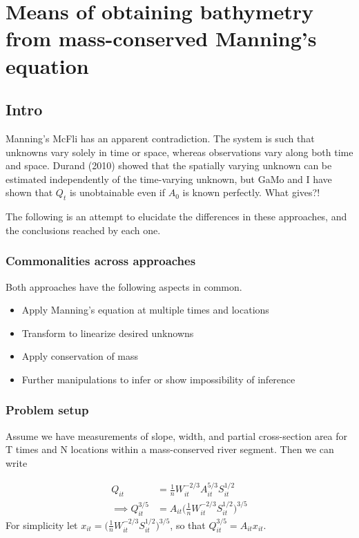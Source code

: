 \documentclass[]{article}
\title{}
\author{}
\date{}
\providecommand{\tightlist}{%
  \setlength{\itemsep}{0pt}\setlength{\parskip}{0pt}}
\begin{document}
\section{Means of obtaining bathymetry from mass-conserved Manning's
equation}\label{means-of-obtaining-bathymetry-from-mass-conserved-mannings-equation}

\subsection{Intro}\label{intro}

Manning's McFli has an apparent contradiction. The system is such that
unknowns vary solely in time or space, whereas observations vary along
both time and space. Durand (2010) showed that the spatially varying
unknown can be estimated independently of the time-varying unknown, but
GaMo and I have shown that \(Q_t\) is unobtainable even if \(A_0\) is
known perfectly. What gives?!

The following is an attempt to elucidate the differences in these
approaches, and the conclusions reached by each one.

\subsubsection{Commonalities across
approaches}\label{commonalities-across-approaches}

Both approaches have the following aspects in common.

\begin{itemize}
\tightlist
\item
  Apply Manning's equation at multiple times and locations
\item
  Transform to linearize desired unknowns
\item
  Apply conservation of mass
\item
  Further manipulations to infer or show impossibility of inference
\end{itemize}

\subsubsection{Problem setup}\label{problem-setup}

Assume we have measurements of slope, width, and partial cross-section
area for T times and N locations within a mass-conserved river segment.
Then we can write

\[
\begin{aligned}
Q_{it} &= \frac{1}{n} W_{it}^{-2/3} A_{it}^{5/3}S_{it}^{1/2} \\
\implies Q^{3/5}_{it} & = A_{it}\Big(\frac{1}{n} W_{it}^{-2/3} S_{it}^{1/2} \Big)^{3/5}
\end{aligned}
\] For simplicity let
\(x_{it} = \Big(\frac{1}{n} W_{it}^{-2/3} S_{it}^{1/2} \Big)^{3/5}\), so
that \(Q^{3/5}_{it} = A_{it}x_{it}\).
\end{document}
